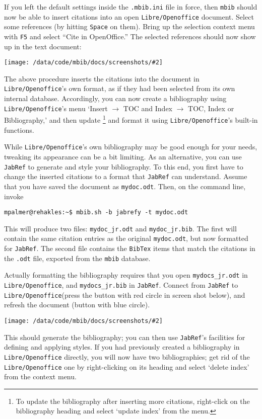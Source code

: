 \documentclass[10pt]{article}
\newcommand*{\mbib}{\texttt{mbib}\xspace}
\newcommand*{\jabref}{\texttt{JabRef}\xspace}
\newcommand*{\loo}{\texttt{Libre\-/Open\-office}\xspace}
\newcommand*{\bibtex}{\texttt{BibTex}\xspace}
\newcommand*{\ini}{\texttt{.mbib.ini}\xspace}
\newcommand*{\key}[1]{\texttt{#1}\xspace}
\newcommand*{\arrowright}{\key{$\rightarrow$}}
\newcommand{\screenshot}[2][]{%
\medskip\par
\begin{center}
\texttt{[image: /data/code/mbib/docs/screenshots/\#2]}
\end{center}}
\begin{document}
If you left the default settings inside the \ini file in force, then \mbib should now be able to insert citations into an open \loo document. Select some references (by hitting \key{Space} on them). Bring up the selection context menu with \key{F5} and select ``Cite in OpenOffice.'' The selected references should now show up in the text document:

\screenshot[clip,trim=0 0 3px 0]{cite-ooo}

\noindent The above procedure inserts the citations into the document in \loo{}'s own format, as if they had been selected from its own internal database. Accordingly, you can now create a bibliography using \loo{}'s menu `Insert \arrowright TOC and Index \arrowright TOC, Index or Bibliography,' and then update%
%
\footnote{To update the bibliography after inserting more citations, right-click on the bibliography heading and select `update index' from the menu.}
%
and format it using \loo's built-in functions. 

While \loo{}'s own bibliography may be good enough for your needs, tweaking its appearance can be a bit limiting. As an alternative, you can use \jabref to generate and style your bibliography. To this end, you first have to change the inserted citations to a format that \jabref can understand. Assume that you have saved the document as \texttt{mydoc.odt}. Then, on the command line, invoke 

\begin{verbatim}
mpalmer@rehakles:~$ mbib.sh -b jabrefy -t mydoc.odt
\end{verbatim}

\noindent This will produce two files: \texttt{mydoc\_jr.odt} and \texttt{mydoc\_jr.bib}. The first will contain the same citation entries as the original \texttt{mydoc.odt}, but now formatted for \jabref. The second file contains the \bibtex items that match the citations in the \texttt{.odt} file, exported from the \mbib database.  

Actually formatting the bibliography requires that you open \texttt{mydocs\_jr.odt} in \loo, and \texttt{mydocs\_jr.bib} in \jabref. Connect from \jabref to \loo (press the button with red circle in screen shot below), and refresh the document (button with blue circle). 

\screenshot{jabref}

\noindent This should generate the bibliography; you can then use \jabref's facilities for defining and applying styles. If you had previously created a bibliography in \loo directly, you will now have two bibliographies; get rid of the \loo one by right-clicking on its heading and select `delete index' from the context menu.
\end{document}

